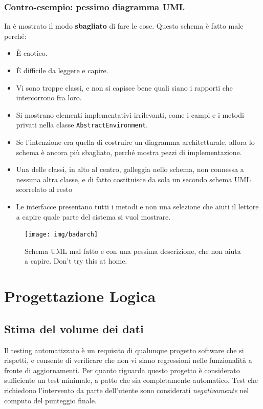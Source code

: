 \documentclass[a4paper,12pt]{report}
\begin{document}
\subsection*{Contro-esempio: pessimo diagramma UML}

In  è mostrato il modo \textbf{sbagliato} di fare le cose.
%
Questo schema è fatto male perché:
\begin{itemize}
    \item È caotico.
    \item È difficile da leggere e capire.
    \item Vi sono troppe classi, e non si capisce bene quali siano i rapporti che intercorrono fra loro.
    \item Si mostrano elementi implementativi irrilevanti, come i campi e i metodi privati nella classe \texttt{AbstractEnvironment}.
    \item Se l'intenzione era quella di costruire un diagramma architetturale, allora lo schema è ancora più sbagliato, perché mostra pezzi di implementazione.
    \item Una delle classi, in alto al centro, galleggia nello schema, non connessa a nessuna altra classe, e di fatto costituisce da sola un secondo schema UML scorrelato al resto
    \item Le interfacce presentano tutti i metodi e non una selezione che aiuti il lettore a capire quale parte del sistema si vuol mostrare.
\end{itemize}


\begin{figure}[h]
\centering{}
\texttt{[image: img/badarch]}
\caption{Schema UML mal fatto e con una pessima descrizione, che non aiuta a capire. Don't try this at home.}
\label{img:badarch}
\end{figure}


\chapter{Progettazione Logica}
\section{Stima del volume dei dati}

Il testing automatizzato è un requisito di qualunque progetto software che si rispetti, e consente di verificare che non vi siano regressioni nelle funzionalità a fronte di aggiornamenti.
%
Per quanto riguarda questo progetto è considerato sufficiente un test minimale, a patto che sia completamente automatico.
%
Test che richiedono l'intervento da parte dell'utente sono considerati \textit{negativamente} nel computo del punteggio finale.
\end{document}
